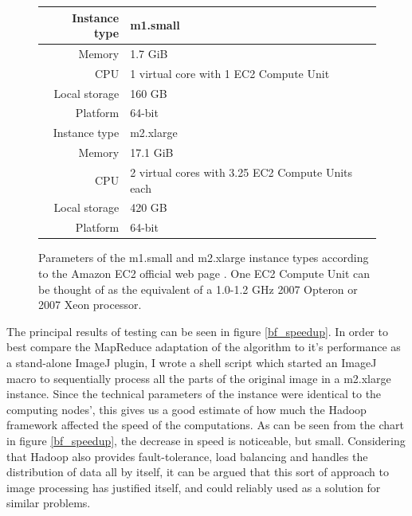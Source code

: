 \documentclass [12pt,a4paper]{report}
\begin{document}
\begin{figure}[h]
\begin{center}
\begin{tabular}{r | l}
Instance type & m1.small \\
\hline
Memory & 1.7 GiB \\
CPU & 1 virtual core with 1 EC2 Compute Unit \\
Local storage & 160 GB \\
Platform & 64-bit \\
\hline\hline
Instance type & m2.xlarge \\
\hline
Memory & 17.1 GiB \\
CPU & 2 virtual cores with 3.25 EC2 Compute Units each \\
Local storage & 420 GB \\
Platform & 64-bit \\
\end{tabular}
\caption{Parameters of the m1.small and m2.xlarge instance types according to the Amazon EC2 official web page \cite{ec2_instancetypes}. One EC2 Compute Unit can be thought of as the equivalent of a 
1.0-1.2 GHz 2007 Opteron or 2007 Xeon processor.}
\label{fig_instance_types}
\end{center}
\end{figure}

The principal results of testing can be seen in figure \ref{bf_speedup}. In order to best compare the MapReduce adaptation of the algorithm to it's performance as a stand-alone ImageJ plugin, I wrote a shell script which started an ImageJ macro to sequentially process all the parts of the original image in a m2.xlarge instance. Since the technical parameters of the instance were identical to the computing nodes', this gives us a good estimate of how much the Hadoop framework affected the speed of the computations. As can be seen from the chart in figure \ref{bf_speedup}, the decrease in speed is noticeable, but small. Considering that Hadoop also provides fault-tolerance, load balancing and handles the distribution of data all by itself, it can be argued that this sort of approach to image processing has justified itself, and could reliably used as a solution for similar problems.
\end{document}
